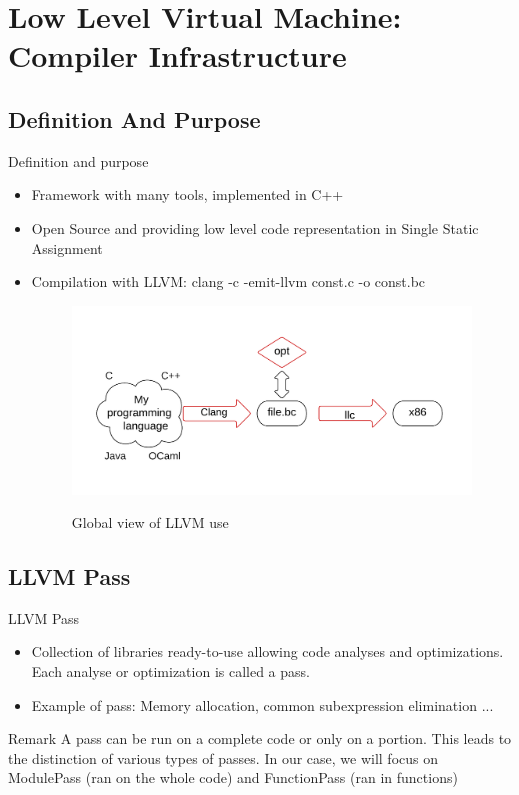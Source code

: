 \documentclass{beamer}
\begin{document}
\section{Low Level Virtual Machine: Compiler Infrastructure}

\subsection{Definition And Purpose}
    \begin{frame}{Definition and purpose}
        \begin{itemize}
            \item Framework with many tools, implemented in C++
            \item Open Source and providing low level code representation in Single Static Assignment
            \item Compilation with LLVM: clang -c -emit-llvm const.c -o const.bc    
        \begin{figure}[ht]
         \center
            \includegraphics[width=0.7\linewidth]{llvmintro.PNG}
         \label{Pass}
         \caption{Global view of LLVM use}
        \end{figure}
        \end{itemize}
    \end{frame}

\subsection{LLVM Pass}
    \begin{frame}{LLVM Pass}
    \begin{itemize}
            \item Collection of libraries ready-to-use allowing
code analyses and optimizations. Each analyse or optimization
is called a pass.
            \item Example of pass: Memory allocation, common subexpression elimination ...
        \end{itemize}
        \begin{alertblock}{Remark}
                A pass can be run on a complete code or only on a
portion. This leads to the distinction of various types
of passes. In our case, we will focus on ModulePass
(ran on the whole code) and FunctionPass (ran in functions)
        \end{alertblock}
    \end{frame}
\end{document}
